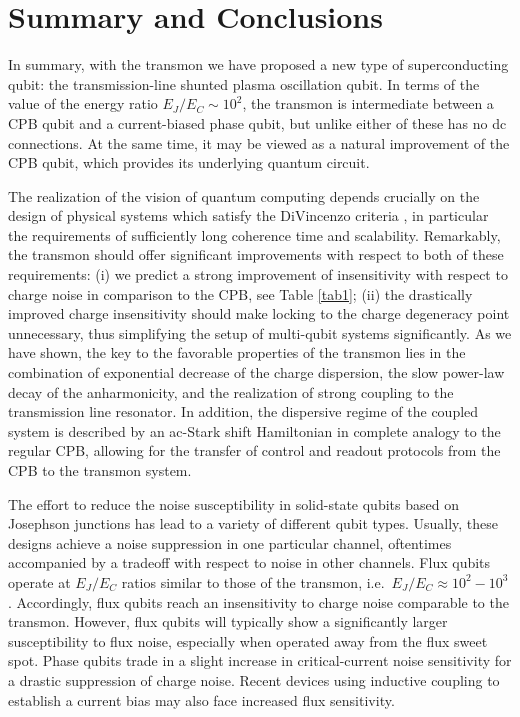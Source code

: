 \documentclass[twocolumn,amsmath,amssymb,floatfix,pra,showpacs,eqsecnum,footinbib,superscriptaddress]{revtex4}
\begin{document}
\section{Summary and Conclusions\label{sec:conclusions}}
In summary, with the transmon we have proposed a new type of superconducting qubit: the transmission-line shunted plasma oscillation qubit. In terms of the value of the energy ratio $E_J/E_C\sim10^2$, the transmon is intermediate between a CPB qubit and a current-biased phase qubit, but unlike either of these has no dc connections. At the same time, it may be viewed as a natural improvement of the CPB qubit, which provides its underlying quantum circuit.

The realization of the vision of quantum computing depends crucially on the design of physical systems which satisfy the DiVincenzo criteria \cite{divincenzo}, in particular the requirements of sufficiently long coherence time and scalability. Remarkably, the transmon should offer significant improvements with respect to both of these requirements: (i) we predict a strong improvement of insensitivity with respect to charge noise in comparison to the CPB, see Table \ref{tab1}; (ii) the drastically improved charge insensitivity should make locking to the charge degeneracy point unnecessary, thus simplifying the setup of multi-qubit systems significantly. As we have shown, the key to the favorable properties of the transmon lies in the combination of exponential decrease of the charge dispersion, the slow power-law decay of the anharmonicity, and the realization of strong coupling to the transmission line resonator. In addition, the dispersive regime of the coupled system is described by an ac-Stark shift Hamiltonian in complete analogy to the regular CPB, allowing for the transfer of control and readout protocols from the CPB to the transmon system.

The effort to reduce the noise susceptibility in solid-state qubits based on Josephson junctions has lead to a variety of different qubit types. Usually, these designs achieve a noise suppression in one particular channel, oftentimes accompanied by a tradeoff with respect to noise in other channels. Flux qubits \cite{friedman,wal} operate at $E_J/E_C$ ratios similar to those of the transmon, i.e.\ $E_J/E_C\approx10^2-10^3$. Accordingly, flux qubits reach an insensitivity to charge noise comparable to the transmon. However, flux qubits will typically show a significantly larger susceptibility to flux noise, especially when operated away from the flux sweet spot. Phase qubits \cite{martinis} trade in a slight increase in critical-current noise sensitivity for a drastic suppression of charge noise. Recent devices using inductive coupling to establish a current bias \cite{steffen} may also face increased flux sensitivity. 
\end{document}
